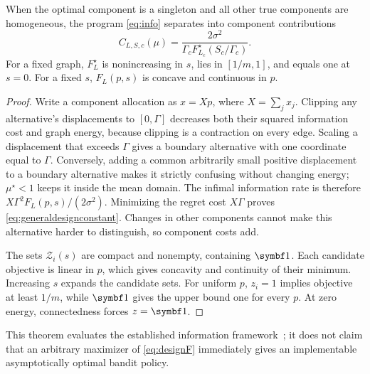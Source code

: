\begin{theorem}
When the optimal component is a singleton and all other true components are homogeneous, the program \eqref{eq:info} separates into component contributions
\begin{equation}
 C_{L,S,c}(\mu)=\frac{2\sigma^2}{\Gamma_c F_{L_c}^\star(S_c/\Gamma_c)}.
 \label{eq:generaldesignconstant}
\end{equation}
For a fixed graph, $F_L^\star$ is nonincreasing in $s$, lies in $[1/m,1]$, and equals one at $s=0$. For a fixed $s$, $F_L(p,s)$ is concave and continuous in $p$.
\label{thm:generaldesign}
\end{theorem}
\begin{proof}
Write a component allocation as $x=Xp$, where $X=\sum_jx_j$. Clipping any alternative's displacements to $[0,\Gamma]$ decreases both their squared information cost and graph energy, because clipping is a contraction on every edge. Scaling a displacement that exceeds $\Gamma$ gives a boundary alternative with one coordinate equal to $\Gamma$. Conversely, adding a common arbitrarily small positive displacement to a boundary alternative makes it strictly confusing without changing energy; $\mu^\star<1$ keeps it inside the mean domain. The infimal information rate is therefore $X\Gamma^2F_L(p,s)/(2\sigma^2)$. Minimizing the regret cost $X\Gamma$ proves \eqref{eq:generaldesignconstant}. Changes in other components cannot make this alternative harder to distinguish, so component costs add.

The sets $\mathcal Z_i(s)$ are compact and nonempty, containing $\one$. Each candidate objective is linear in $p$, which gives concavity and continuity of their minimum. Increasing $s$ expands the candidate sets. For uniform $p$, $z_i=1$ implies objective at least $1/m$, while $\one$ gives the upper bound one for every $p$. At zero energy, connectedness forces $z=\one$.
\end{proof}
This theorem evaluates the established information framework~\cite{combes2017}; it does not claim that an arbitrary maximizer of \eqref{eq:designF} immediately gives an implementable asymptotically optimal bandit policy.

